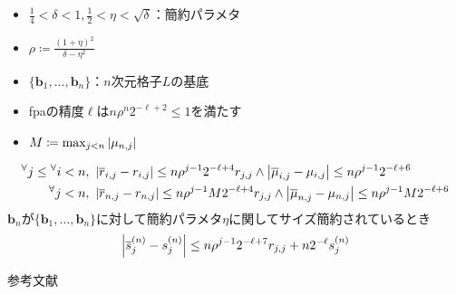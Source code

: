 \documentclass[12pt,aspectratio=169,table,dvipdfmx, leqno]{beamer}
\begin{document}
\begin{frame}
\begin{itemize}
    \item $\frac{1}{4}<\delta<1, \frac{1}{2}<\eta<\sqrt{\delta}$：簡約パラメタ
    \item $\rho\coloneqq \frac{(1+\eta)^2}{\delta-\eta^2}$
    \item $\{\bm{b}_1,\ldots,\bm{b}_n\}$：$n$次元格子$L$の基底
    \item fpaの精度$\ell$は$n\rho^n 2^{-\ell+2}\le 1$を満たす
    \item $M\coloneqq \max_{j<n} \abs{\mu_{n, j}}$
\end{itemize}
\cite{SE94}
\begin{align}
    {}^\forall j\le{}^\forall i<n&,~\abs{\overline{r}_{i, j}-r_{i, j}}\le n\rho^{j-1}2^{-\ell+4}r_{j, j}\land \abs{\overline{\mu}_{i, j}-\mu_{i, j}}\le n\rho^{j-1}2^{-\ell+6}\\
    {}^\forall j < n&,~\abs{\overline{r}_{n, j}-r_{n, j}}\le n\rho^{j-1}M2^{-\ell+4}r_{j, j}\land \abs{\overline{\mu}_{n, j}-\mu_{n, j}}\le n\rho^{j-1}M2^{-\ell+6}
\end{align}
$\bm{b}_n$が$\{\bm{b}_1,\ldots,\bm{b}_n\}$に対して簡約パラメタ$\eta$に関してサイズ簡約されているとき
\begin{equation}
    \abs{\overline{s}_{j}^{(n)}-s_{j}^{(n)}}\le n\rho^{j-1}2^{-\ell+7}r_{j, j}+n2^{-\ell}s_{j}^{(n)}
\end{equation}
\end{frame}

\begin{frame}[allowframebreaks]{参考文献}
\beamertemplatetextbibitems


\end{frame}
\end{document}
